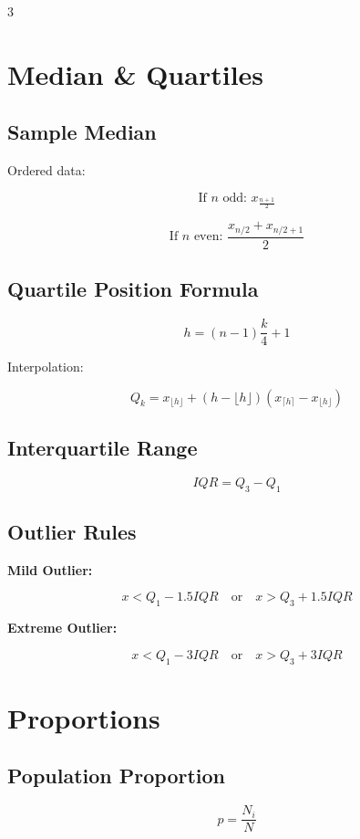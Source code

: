 \documentclass[10pt]{article}
\begin{document}
\begin{multicols}{3}
\section*{Median \& Quartiles}

\subsection*{Sample Median}

Ordered data:

\[
\text{If } n \text{ odd: } x_{\frac{n+1}{2}}
\]

\[
\text{If } n \text{ even: } \frac{x_{n/2} + x_{n/2+1}}{2}
\]

\subsection*{Quartile Position Formula}

\[
h = (n - 1)\frac{k}{4} + 1
\]

Interpolation:

\[
Q_k = x_{\lfloor h \rfloor} + (h - \lfloor h \rfloor)
(x_{\lceil h \rceil} - x_{\lfloor h \rfloor})
\]

\subsection*{Interquartile Range}

\[
IQR = Q_3 - Q_1
\]

\subsection*{Outlier Rules}

\textbf{Mild Outlier:}

\[
x < Q_1 - 1.5 IQR
\quad \text{or} \quad
x > Q_3 + 1.5 IQR
\]

\textbf{Extreme Outlier:}

\[
x < Q_1 - 3 IQR
\quad \text{or} \quad
x > Q_3 + 3 IQR
\]

\section*{Proportions}

\subsection*{Population Proportion}
\[
p = \frac{N_i}{N}
\]


\end{multicols}
\end{document}

